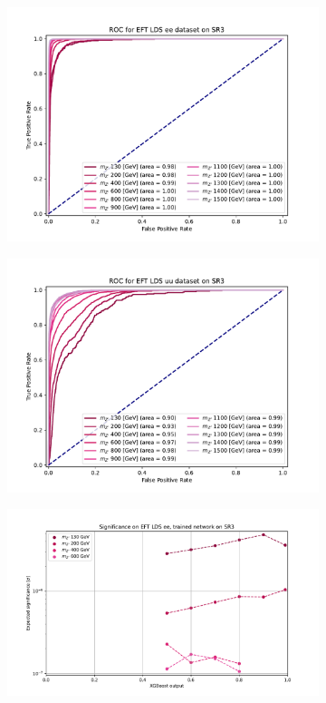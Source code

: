 \documentclass[12pt, a4paper]{book}
\begin{document}
\begin{figure}[!ht]
\begin{subfigure}[b]{0.49\textwidth}
      \includegraphics[width=1\textwidth]{XGBoost/Model_independent/150/EFT_LDS/ROC_ee.pdf}
   \end{subfigure}
   \hfill
   \begin{subfigure}[b]{0.49\textwidth}
      \centering
      \includegraphics[width=1\textwidth]{XGBoost/Model_independent/150/EFT_LDS/ROC_uu.pdf}
   \end{subfigure}
   \hfill
	\begin{subfigure}[b]{0.49\textwidth}
      \centering
      \includegraphics[width=1\textwidth]{XGBoost/Model_independent/150/EFT_LDS/EXP_SIG_ee.pdf}

\end{subfigure}
\end{figure}
\end{document}
